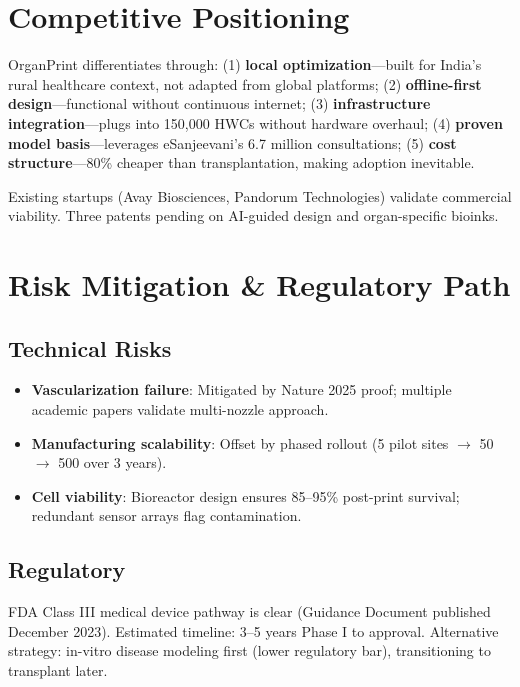 \documentclass[11pt,a4paper]{article}
\begin{document}
\section{Competitive Positioning}

OrganPrint differentiates through: (1) \textbf{local optimization}---built for India's rural healthcare context, not adapted from global platforms; (2) \textbf{offline-first design}---functional without continuous internet; (3) \textbf{infrastructure integration}---plugs into 150,000 HWCs without hardware overhaul; (4) \textbf{proven model basis}---leverages eSanjeevani's 6.7 million consultations; (5) \textbf{cost structure}---80\% cheaper than transplantation, making adoption inevitable.

Existing startups (Avay Biosciences, Pandorum Technologies) validate commercial viability. Three patents pending on AI-guided design and organ-specific bioinks.

\section{Risk Mitigation \& Regulatory Path}

\subsection{Technical Risks}

\begin{itemize}
\item \textbf{Vascularization failure}: Mitigated by Nature 2025 proof; multiple academic papers validate multi-nozzle approach.
\item \textbf{Manufacturing scalability}: Offset by phased rollout (5 pilot sites $\rightarrow$ 50 $\rightarrow$ 500 over 3 years).
\item \textbf{Cell viability}: Bioreactor design ensures 85--95\% post-print survival; redundant sensor arrays flag contamination.
\end{itemize}

\subsection{Regulatory}

FDA Class III medical device pathway is clear (Guidance Document published December 2023). Estimated timeline: 3--5 years Phase I to approval. Alternative strategy: in-vitro disease modeling first (lower regulatory bar), transitioning to transplant later.
\end{document}
